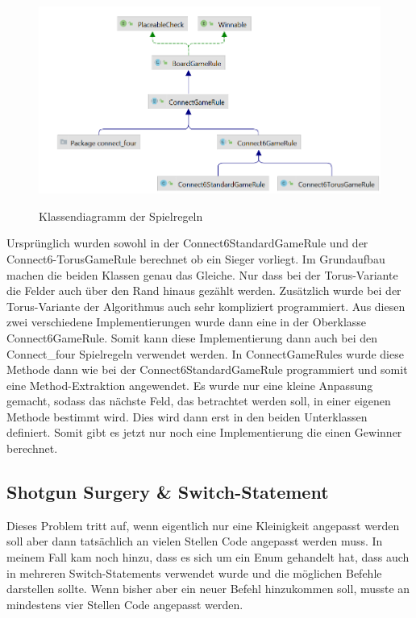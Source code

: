 \documentclass[12pt]{article}
\begin{document}
\begin{figure}[H]
\centering
{\includegraphics[width=13cm]{Bilder/ClassDiagGameRules}}
\caption{Klassendiagramm der Spielregeln}
\label{fig:ClassDiagGameRules}
\end{figure}

Ursprünglich wurden sowohl in der Connect6StandardGameRule und der Connect6-TorusGameRule berechnet ob ein Sieger vorliegt. Im Grundaufbau machen die beiden Klassen genau das Gleiche. Nur dass bei der Torus-Variante die Felder auch über den Rand hinaus gezählt werden. Zusätzlich wurde bei der Torus-Variante der Algorithmus auch sehr kompliziert programmiert. Aus diesen zwei verschiedene Implementierungen wurde dann eine in der Oberklasse Connect6GameRule. Somit kann diese Implementierung dann auch bei den Connect\_four Spielregeln verwendet werden. In ConnectGameRules wurde diese Methode dann wie bei der Connect6StandardGameRule programmiert und somit eine Method-Extraktion angewendet. Es wurde nur eine kleine Anpassung gemacht, sodass das nächste Feld, das betrachtet werden soll, in einer eigenen Methode bestimmt wird. Dies wird dann erst in den beiden Unterklassen definiert. Somit gibt es jetzt nur noch eine Implementierung die einen Gewinner berechnet.



\subsection{Shotgun Surgery \& Switch-Statement}
Dieses Problem tritt auf, wenn eigentlich nur eine Kleinigkeit angepasst werden soll aber dann tatsächlich an vielen Stellen Code angepasst werden muss. In meinem Fall kam noch hinzu, dass es sich um ein Enum gehandelt hat, dass auch in mehreren Switch-Statements verwendet wurde und die möglichen Befehle darstellen sollte. Wenn bisher aber ein neuer Befehl hinzukommen soll, musste an mindestens vier Stellen Code angepasst werden.
\\
\end{document}

